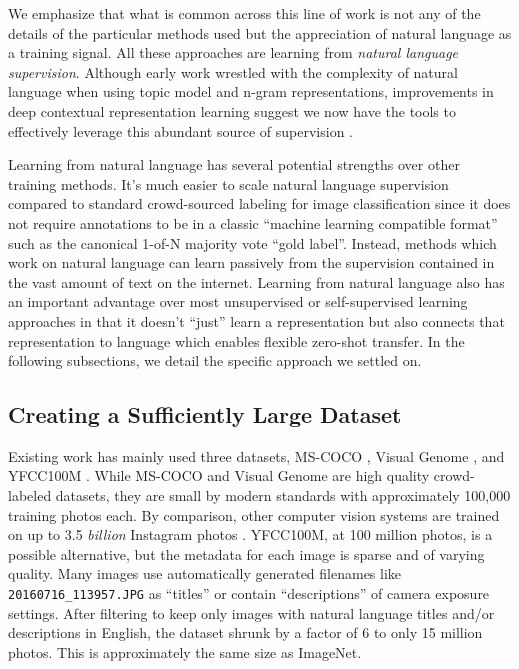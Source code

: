 \documentclass{article}
\begin{document}
We emphasize that what is common across this line of work is not any of the details of the particular methods used but the appreciation of natural language as a training signal. All these approaches are learning from \textit{natural language supervision}. Although early work wrestled with the complexity of natural language when using topic model and n-gram representations, improvements in deep contextual representation learning suggest we now have the tools to effectively leverage this abundant source of supervision \citep{mccann2017learned}.



Learning from natural language has several potential strengths over other training methods. It's much easier to scale natural language supervision compared to standard crowd-sourced labeling for image classification since it does not require annotations to be in a classic ``machine learning compatible format'' such as the canonical 1-of-N majority vote ``gold label''. Instead, methods which work on natural language can learn passively from the supervision contained in the vast amount of text on the internet. Learning from natural language also has an important advantage over most unsupervised or self-supervised learning approaches in that it doesn't ``just'' learn a representation but also connects that representation to language which enables flexible zero-shot transfer. In the following subsections, we detail the specific approach we settled on.









\subsection{Creating a Sufficiently Large Dataset}\label{subsection:creating-large-dataset}

Existing work has mainly used three datasets, MS-COCO \citep{lin2014microsoft}, Visual Genome \citep{krishna2017visual}, and YFCC100M \citep{thomee2016yfcc100m}. While MS-COCO and Visual Genome are high quality crowd-labeled datasets, they are small by modern standards with approximately 100,000 training photos each. By comparison, other computer vision systems are trained on up to 3.5 \textit{billion} Instagram photos \citep{mahajan2018exploring}. YFCC100M, at 100 million photos, is a possible alternative, but the metadata for each image is sparse and of varying quality. Many images use automatically generated filenames like \texttt{20160716\_113957.JPG} as ``titles'' or contain ``descriptions'' of camera exposure settings. After filtering to keep only images with natural language titles and/or descriptions in English, the dataset shrunk by a factor of 6 to only 15 million photos. This is approximately the same size as ImageNet.
\end{document}
